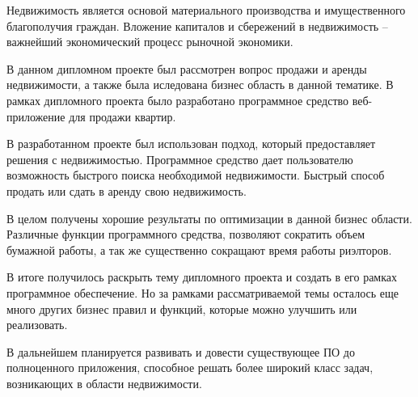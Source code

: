 
Недвижимость является основой материального производства и имущественного благополучия граждан. Вложение капиталов и сбережений в недвижимость – важнейший экономический процесс рыночной экономики. 

В данном дипломном проекте был рассмотрен вопрос продажи и аренды недвижимости, а также была иследована бизнес область в данной тематике. В рамках дипломного проекта было разработано программное средство веб-приложение для продажи квартир.

В разработанном проекте был использован подход, который предоставляет решения с недвижимостью. Программное средство дает пользователю возможность быстрого поиска необходимой недвижимости. Быстрый способ продать или сдать в аренду свою недвижимость. 

В целом получены хорошие результаты по оптимизации в данной бизнес области. Различные функции программного средства, позволяют сократить объем бумажной работы, а так же существенно сокращают время работы риэлторов. 

В итоге получилось раскрыть тему дипломного проекта и создать в его рамках программное обеспечение.
Но за рамками рассматриваемой темы осталось еще много других бизнес правил и функций, которые можно улучшить или реализовать.

В дальнейшем планируется развивать и довести существующее ПО до полноценного приложения, способное решать более широкий класс задач, возникающих в области недвижимости.